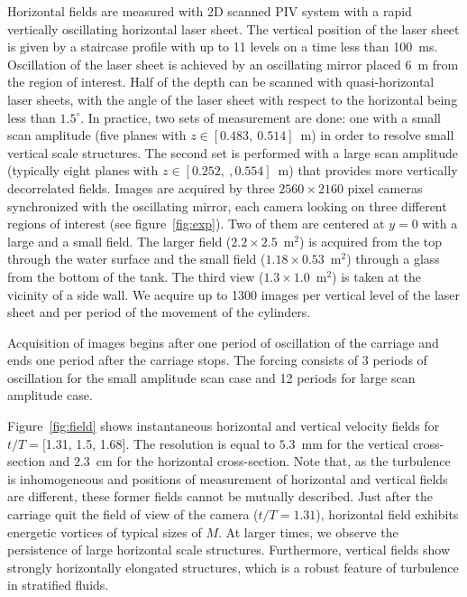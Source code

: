 \noindent Horizontal fields are measured with 2D scanned PIV system with a
rapid vertically oscillating horizontal laser sheet. The vertical position of
the laser sheet is given by a staircase profile with up to 11 levels on a time
less than 100~ms. Oscillation of the laser sheet is achieved by an
oscillating mirror placed 6~m from the region of interest. Half of the depth can be scanned with quasi-horizontal laser sheets, with the angle of the
laser sheet with respect to the horizontal being less than $1.5^{\circ}$. In
practice, two sets of measurement are done: one with a small scan amplitude
(five planes with $z\in[0.483,~0.514]$~m) in order to resolve small vertical
scale structures. The second set is performed with a large scan amplitude
(typically eight planes with $z\in[0.252,~,0.554]$~m) that provides more
vertically decorrelated fields.
%
Images are acquired by three $2560\times2160$ pixel cameras synchronized with
the oscillating mirror, each camera looking on three different regions of
interest (see figure~\ref{fig:exp}). Two of them are centered at $y=0$ with a
large and a small field. The larger field ($2.2\times2.5$~m$^2$) is acquired
from the top through the water surface and the small field
($1.18\times0.53$~m$^2$) through a glass from the bottom of the tank. The third
view ($1.3\times1.0 $~m$^2$) is taken at the vicinity of a side wall. We
acquire up to 1300 images per vertical level of the laser sheet and per period
of the movement of the cylinders.

\noindent Acquisition of images begins after one period of oscillation of the
carriage and ends one period after the carriage stops. The forcing consists of
3 periods of oscillation for the small amplitude scan case and 12 periods for
large scan amplitude case.

\noindent Figure~\ref{fig:field} shows instantaneous horizontal and vertical velocity
fields for $t/T = [$1.31, 1.5, 1.68$]$. 
%
The resolution is equal to $5.3$~mm for the vertical cross-section and $2.3$~cm
for the horizontal cross-section.
%
Note that, as the turbulence is inhomogeneous and positions of measurement of
horizontal and vertical fields are different, these former fields cannot be
mutually described. Just after the carriage quit the field of view of the
camera ($t/T=1.31$), horizontal field exhibits energetic vortices of typical
sizes of $M$. At larger times, we observe the persistence of large horizontal
scale structures. Furthermore, vertical fields show strongly horizontally
elongated structures, which is a robust feature of turbulence in stratified
fluids.

